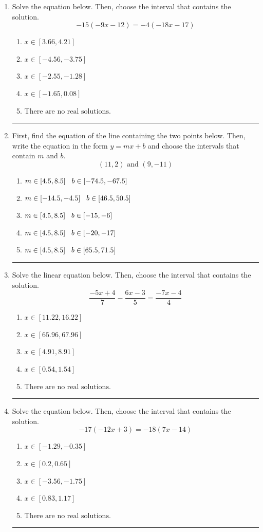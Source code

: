 \documentclass[14pt]{extbook}
\newcommand{\litem}[1]{\item#1\hspace*{-1cm}\rule{\textwidth}{0.4pt}}
\begin{document}
\begin{enumerate}
{\begin{enumerate}[label=\Alph*.]
\end{enumerate} }
\litem{
Solve the equation below. Then, choose the interval that contains the solution.\[ -15(-9x -12) = -4(-18x -17) \]\begin{enumerate}[label=\Alph*.]
\item \( x \in [3.66, 4.21] \)
\item \( x \in [-4.56, -3.75] \)
\item \( x \in [-2.55, -1.28] \)
\item \( x \in [-1.65, 0.08] \)
\item \( \text{There are no real solutions.} \)

\end{enumerate} }
\litem{
First, find the equation of the line containing the two points below. Then, write the equation in the form $ y=mx+b $ and choose the intervals that contain $m$ and $b$.\[ (11, 2) \text{ and } (9, -11) \]\begin{enumerate}[label=\Alph*.]
\item \( m \in [4.5, 8.5] \hspace*{3mm} b \in [-74.5, -67.5] \)
\item \( m \in [-14.5, -4.5] \hspace*{3mm} b \in [46.5, 50.5] \)
\item \( m \in [4.5, 8.5] \hspace*{3mm} b \in [-15, -6] \)
\item \( m \in [4.5, 8.5] \hspace*{3mm} b \in [-20, -17] \)
\item \( m \in [4.5, 8.5] \hspace*{3mm} b \in [65.5, 71.5] \)

\end{enumerate} }
\litem{
Solve the linear equation below. Then, choose the interval that contains the solution.\[ \frac{-5x + 4}{7} - \frac{6x -3}{5} = \frac{-7x -4}{4} \]\begin{enumerate}[label=\Alph*.]
\item \( x \in [11.22, 16.22] \)
\item \( x \in [65.96, 67.96] \)
\item \( x \in [4.91, 8.91] \)
\item \( x \in [0.54, 1.54] \)
\item \( \text{There are no real solutions.} \)

\end{enumerate} }
\litem{
Solve the equation below. Then, choose the interval that contains the solution.\[ -17(-12x + 3) = -18(7x -14) \]\begin{enumerate}[label=\Alph*.]
\item \( x \in [-1.29, -0.35] \)
\item \( x \in [0.2, 0.65] \)
\item \( x \in [-3.56, -1.75] \)
\item \( x \in [0.83, 1.17] \)
\item \( \text{There are no real solutions.} \)


\end{enumerate}}
\end{enumerate}
\end{document}
